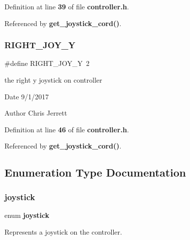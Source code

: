 Definition at line \textbf{ 39} of file \textbf{ controller.\+h}.



Referenced by \textbf{ get\+\_\+joystick\+\_\+cord()}.

\mbox{\label{controller_8h_a99457bf9dee795334411ea77f0858b16}} 
\subsubsection{R\+I\+G\+H\+T\+\_\+\+J\+O\+Y\+\_\+Y}
{\footnotesize\ttfamily \#define R\+I\+G\+H\+T\+\_\+\+J\+O\+Y\+\_\+Y~2}



the right y joystick on controller 

\begin{DoxyDate}{Date}
9/1/2017 
\end{DoxyDate}
\begin{DoxyAuthor}{Author}
Chris Jerrett 
\end{DoxyAuthor}


Definition at line \textbf{ 46} of file \textbf{ controller.\+h}.



Referenced by \textbf{ get\+\_\+joystick\+\_\+cord()}.



\subsection{Enumeration Type Documentation}
\mbox{\label{controller_8h_ac365c9e892abe4a1b85ae8f56a4eae5a}} 
\subsubsection{joystick}
{\footnotesize\ttfamily enum \textbf{ joystick}}



Represents a joystick on the controller. 


